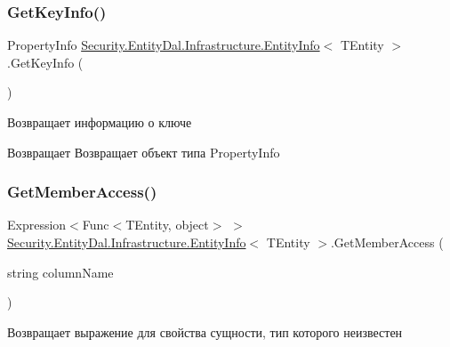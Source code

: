 \subsubsection{\texorpdfstring{Get\+Key\+Info()}{GetKeyInfo()}}
{\footnotesize\ttfamily Property\+Info \hyperlink{class_security_1_1_entity_dal_1_1_infrastructure_1_1_entity_info}{Security.\+Entity\+Dal.\+Infrastructure.\+Entity\+Info}$<$ T\+Entity $>$.Get\+Key\+Info (\begin{DoxyParamCaption}{ }\end{DoxyParamCaption})}



Возвращает информацию о ключе 

\begin{DoxyReturn}{Возвращает}
Возвращает объект типа Property\+Info
\end{DoxyReturn}
\mbox{\label{class_security_1_1_entity_dal_1_1_infrastructure_1_1_entity_info_a00fbeaff893bc743c782586ae88e5070}} 
\subsubsection{\texorpdfstring{Get\+Member\+Access()}{GetMemberAccess()}}
{\footnotesize\ttfamily Expression$<$Func$<$T\+Entity, object$>$ $>$ \hyperlink{class_security_1_1_entity_dal_1_1_infrastructure_1_1_entity_info}{Security.\+Entity\+Dal.\+Infrastructure.\+Entity\+Info}$<$ T\+Entity $>$.Get\+Member\+Access (\begin{DoxyParamCaption}\item[{string}]{column\+Name }\end{DoxyParamCaption})}



Возвращает выражение для свойства сущности, тип которого неизвестен 


